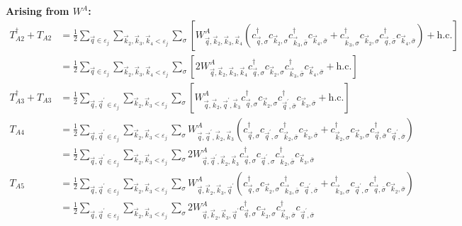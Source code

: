 \documentclass{revtex4-2}
\begin{document}
{\bf Arising from \(W^A\):}
\begin{equation}\begin{aligned}
	T_{A2}^\dagger + T_{A2} &= \frac{1}{2}\sum_{\vec q \in \varepsilon_j}\sum_{\vec k_2, \vec k_3, \vec k_4 < \varepsilon_j}\sum_{\sigma} \left[W^A_{\vec q,\vec k_2,\vec k_3,\vec k_4}\left(c^\dagger_{\vec q,\sigma}c_{\vec k_2,\sigma}c^\dagger_{\vec k_3,\bar\sigma}c_{\vec k_4,\bar\sigma} + c^\dagger_{\vec k_3,\sigma}c_{\vec k_2,\sigma}c^\dagger_{\vec q,\bar\sigma}c_{\vec k_4,\bar\sigma}\right) + \text{h.c.}\right]\\
				&= \frac{1}{2}\sum_{\vec q \in \varepsilon_j}\sum_{\vec k_2, \vec k_3, \vec k_4 < \varepsilon_j}\sum_{\sigma} \left[2W^A_{\vec q,\vec k_2,\vec k_3,\vec k_4}c^\dagger_{\vec q,\sigma}c_{\vec k_2,\sigma}c^\dagger_{\vec k_3,\bar\sigma}c_{\vec k_4,\bar\sigma} + \text{h.c.}\right]\\
	T_{A3}^\dagger + T_{A3} &= \frac{1}{2}\sum_{\vec q, \vec q^\prime \in \varepsilon_j}\sum_{\vec k_2, \vec k_3 < \varepsilon_j}\sum_{\sigma} \left[W^A_{\vec q,\vec k_2, \vec q^\prime, \vec k_3}c^\dagger_{\vec q,\sigma}c_{\vec k_2,\sigma}c^\dagger_{\vec q^\prime,\bar\sigma}c_{\vec k_3,\bar\sigma} + \text{h.c.}\right]\\
	T_{A4} &= \frac{1}{2}\sum_{\vec q, \vec q^\prime \in \varepsilon_j}\sum_{\vec k_2, \vec k_3 < \varepsilon_j}\sum_{\sigma}W^A_{\vec q,\vec q^\prime,\vec k_2,\vec k_3} \left(c^\dagger_{\vec q,\sigma}c_{\vec q^\prime,\sigma}c^\dagger_{\vec k_2,\bar\sigma}c_{\vec k_3,\bar\sigma} + c^\dagger_{\vec k_2,\sigma}c_{\vec k_3,\sigma}c^\dagger_{\vec q,\bar\sigma}c_{\vec q^\prime,\bar\sigma}\right)\\
				&= \frac{1}{2}\sum_{\vec q, \vec q^\prime \in \varepsilon_j}\sum_{\vec k_2, \vec k_3 < \varepsilon_j}\sum_{\sigma}2W^A_{\vec q,\vec q^\prime,\vec k_2,\vec k_3} c^\dagger_{\vec q,\sigma}c_{\vec q^\prime,\sigma}c^\dagger_{\vec k_2,\bar\sigma}c_{\vec k_3,\bar\sigma}\\
	T_{A5} &= \frac{1}{2}\sum_{\vec q, \vec q^\prime \in \varepsilon_j}\sum_{\vec k_2, \vec k_3 < \varepsilon_j}\sum_{\sigma}W^A_{\vec q,\vec k_2,\vec k_3,\vec q^\prime} \left(c^\dagger_{\vec q,\sigma}c_{\vec k_2,\sigma}c^\dagger_{\vec k_3,\bar\sigma}c_{\vec q^\prime,\bar\sigma} + c^\dagger_{\vec k_3,\sigma}c_{\vec q^\prime,\sigma}c^\dagger_{\vec q,\bar\sigma}c_{\vec k_2,\bar\sigma}\right) \\
	       &= \frac{1}{2}\sum_{\vec q, \vec q^\prime \in \varepsilon_j}\sum_{\vec k_2, \vec k_3 < \varepsilon_j}\sum_{\sigma}2W^A_{\vec q,\vec k_2,\vec k_3,\vec q^\prime} c^\dagger_{\vec q,\sigma}c_{\vec k_2,\sigma}c^\dagger_{\vec k_3,\bar\sigma}c_{\vec q^\prime,\bar\sigma} \\

\end{aligned}
\end{equation}
\end{document}
